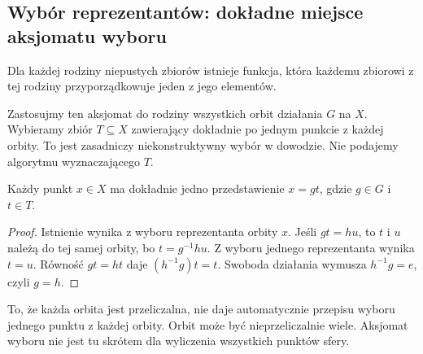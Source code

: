 \subsection{Wybór reprezentantów: dokładne miejsce aksjomatu wyboru}
\begin{definicja}
Dla każdej rodziny niepustych zbiorów istnieje funkcja, która każdemu zbiorowi z tej rodziny przyporządkowuje jeden z jego elementów.
\end{definicja}
Zastosujmy ten aksjomat do rodziny wszystkich orbit działania $G$ na $X$. Wybieramy zbiór $T\subseteq X$ zawierający dokładnie po jednym punkcie z każdej orbity. To jest zasadniczy niekonstruktywny wybór w dowodzie. Nie podajemy algorytmu wyznaczającego $T$.
\begin{lemat}\label{lem:wspolrzedne-orbitowe}
Każdy punkt $x\in X$ ma dokładnie jedno przedstawienie $x=gt$, gdzie $g\in G$ i $t\in T$.
\end{lemat}
\begin{proof}
Istnienie wynika z wyboru reprezentanta orbity $x$. Jeśli $gt=hu$, to $t$ i $u$ należą do tej samej orbity, bo $t=g^{-1}hu$. Z wyboru jednego reprezentanta wynika $t=u$. Równość $gt=ht$ daje $(h^{-1}g)t=t$. Swoboda działania wymusza $h^{-1}g=e$, czyli $g=h$.
\end{proof}
\begin{uwaga}
To, że każda orbita jest przeliczalna, nie daje automatycznie przepisu wyboru jednego punktu z każdej orbity. Orbit może być nieprzeliczalnie wiele. Aksjomat wyboru nie jest tu skrótem dla wyliczenia wszystkich punktów sfery.
\end{uwaga}

